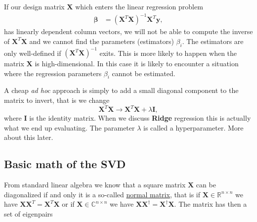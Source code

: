\documentclass[%
oneside,                 %
final,                   %
10pt]{article}
\begin{document}
If our design matrix $\bm{X}$ which enters the linear regression problem
\begin{align}
\bm{\beta} & =  (\bm{X}^{T} \bm{X})^{-1} \bm{X}^{T} \bm{y},
\end{align}
has linearly dependent column vectors, we will not be able to compute the inverse
of $\bm{X}^T\bm{X}$ and we cannot find the parameters (estimators) $\beta_i$. 
The estimators are only well-defined if $(\bm{X}^{T}\bm{X})^{-1}$ exits. 
This is more likely to happen when the matrix $\bm{X}$ is high-dimensional. In this case it is likely to encounter a situation where 
the regression parameters $\beta_i$ cannot be estimated.

A cheap  \emph{ad hoc} approach is  simply to add a small diagonal component to the matrix to invert, that is we change
\[
\bm{X}^{T} \bm{X} \rightarrow \bm{X}^{T} \bm{X}+\lambda \bm{I},
\]
where $\bm{I}$ is the identity matrix.  When we discuss \textbf{Ridge} regression this is actually what we end up evaluating. The parameter $\lambda$ is called a hyperparameter. More about this later. 



\subsection*{Basic math of the SVD}


From standard linear algebra we know that a square matrix $\bm{X}$ can be diagonalized if and only it is 
a so-called \href{{https://en.wikipedia.org/wiki/Normal_matrix}}{normal matrix}, that is if $\bm{X}\in {\mathbb{R}}^{n\times n}$
we have $\bm{X}\bm{X}^T=\bm{X}^T\bm{X}$ or if $\bm{X}\in {\mathbb{C}}^{n\times n}$ we have $\bm{X}\bm{X}^{\dagger}=\bm{X}^{\dagger}\bm{X}$.
The matrix has then a set of eigenpairs 
\end{document}
